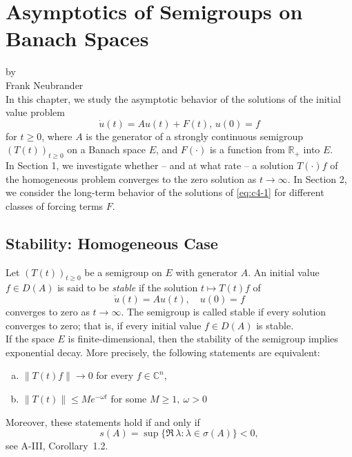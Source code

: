 \chapter{Asymptotics of Semigroups on Banach Spaces}\label{chap:a4}
{\Large
\vspace*{-.75cm}
by \\[.25em]
Frank Neubrander
\vspace{.75cm}
\\
}
In this chapter, we study the asymptotic behavior of the solutions of the initial value problem
\begin{equation}\label{eq:c4-1}
\dot{u}(t) = Au(t) + F(t), \, u(0) = f \tag{*}
\end{equation}
for $ t \geq 0 $, where $ A $ is the generator of a strongly continuous semigroup $ (T(t))_{t \geq 0} $ on a Banach space $ E $, and $ F(\cdot) $ is a function from $ \mathbb{R}_{+} $ into $ E $.\\



In Section 1, we investigate whether -- and at what rate -- a solution $ T(\cdot)f $ of the homogeneous problem converges to the zero solution as $ t \to \infty $. 
In Section 2, we consider the long-term behavior of the solutions of \eqref{eq:c4-1} for different classes of forcing terms $ F $.
\section{Stability: Homogeneous Case}\label{sec:c4-1}
Let $ (T(t))_{t \geq 0} $ be a semigroup on $ E $ with generator $ A $.
An initial value $ f \in D(A) $ is said to be \emph{stable} if the solution $ t \mapsto T(t)f $ of
\begin{equation}\label{eq:c4-2}
\dot{u}(t) = Au(t), \quad u(0) = f \tag{ACP}
\end{equation}
converges to zero as $ t \to \infty $. 
The semigroup is called stable if every solution converges to zero; that is, if every initial value $ f \in D(A) $ is stable.
\\


If the space $ E $ is finite-dimensional, then the stability of the semigroup implies exponential decay. 
More precisely, the following statements are equivalent:
\begin{enumerate}[(a)]
\item $ \|T(t)f\| \to 0 $ for every $ f \in \mathbb{C}^{n} $,
\item $ \|T(t)\| \leq Me^{-\omega t} $ for some $M \geq 1,\ \omega > 0 $
\end{enumerate}
Moreover, these statements hold if and only if
\[
s(A) = \sup\{\Re\,\lambda : \lambda \in \sigma(A)\} < 0,
\]
see A-III, Corollary~1.2.
\goodbreak

